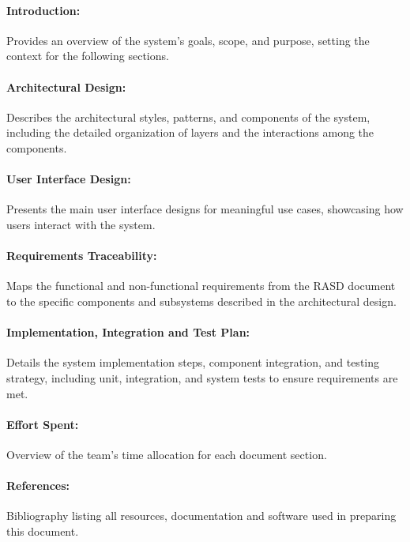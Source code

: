 \paragraph{Introduction:} Provides an overview of the system's goals, scope, and purpose, setting the context for the following sections.
  
\paragraph{Architectural Design:} Describes the architectural styles, patterns, and components of the system, including the detailed organization of layers and the interactions among the components.

\paragraph{User Interface Design:} Presents the main user interface designs for meaningful use cases, showcasing how users interact with the system.

\paragraph{Requirements Traceability:} Maps the functional and non-functional requirements from the RASD document to the specific components and subsystems described in the architectural design.

\paragraph{Implementation, Integration and Test Plan:} Details the system implementation steps, component integration, and testing strategy, including unit, integration, and system tests to ensure requirements are met.

\paragraph{Effort Spent:} Overview of the team's time allocation for each document section.

\paragraph{References:} Bibliography listing all resources, documentation and software used in preparing this document.